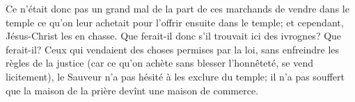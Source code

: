 Ce n’était donc pas un grand mal de la part de ces marchands
	de vendre dans le temple
		ce qu’on leur achetait pour l’offrir ensuite dans le temple;
	et cependant, Jésus-Christ les en chasse.
Que ferait-il donc s’il trouvait ici des ivrognes? Que ferait-il?
Ceux qui vendaient des choses permises par la loi,
	sans enfreindre les règles de la justice
	(car ce qu’on achète sans blesser l’honnêteté, se vend licitement),
	le Sauveur n’a pas hésité à les exclure du temple;
	il n’a pas souffert que la maison de la prière devînt une maison de commerce.
